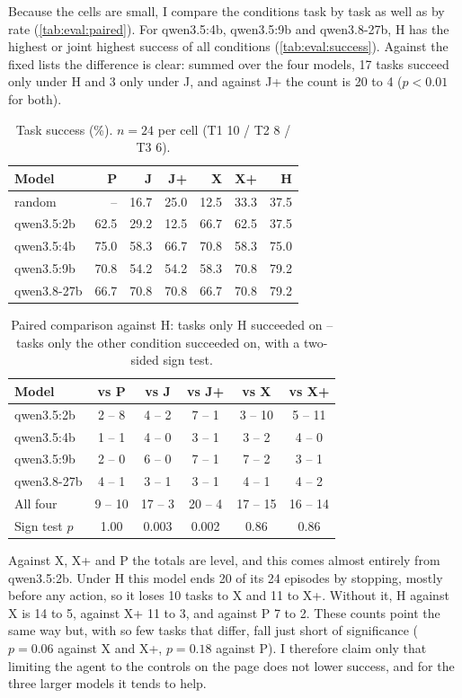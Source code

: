 Because the cells are small, I compare the conditions task by task as well as by rate (\autoref{tab:eval:paired}).
For qwen3.5:4b, qwen3.5:9b and qwen3.8-27b, H has the highest or joint highest success of all conditions (\autoref{tab:eval:success}).
Against the fixed lists the difference is clear: summed over the four models, 17 tasks succeed only under H and 3 only under J, and against J+ the count is 20 to 4 ($p < 0.01$ for both).

\begin{table}[htbp]
\centering
\caption{Task success (\%). $n = 24$ per cell (T1 10 / T2 8 / T3 6).}
\label{tab:eval:success}
\begin{tabular}{lrrrrrr}
\hline
Model & P & J & J+ & X & X+ & H \\
\hline
random & -- & 16.7 & 25.0 & 12.5 & 33.3 & 37.5 \\
qwen3.5:2b & 62.5 & 29.2 & 12.5 & 66.7 & 62.5 & 37.5 \\
qwen3.5:4b & 75.0 & 58.3 & 66.7 & 70.8 & 58.3 & 75.0 \\
qwen3.5:9b & 70.8 & 54.2 & 54.2 & 58.3 & 70.8 & 79.2 \\
qwen3.8-27b & 66.7 & 70.8 & 70.8 & 66.7 & 70.8 & 79.2 \\
\hline
\end{tabular}
\end{table}

\begin{table}[htbp]
\centering
\caption{Paired comparison against H: tasks only H succeeded on -- tasks only the other condition succeeded on, with a two-sided sign test.}
\label{tab:eval:paired}
\begin{tabular}{lccccc}
\hline
Model & vs P & vs J & vs J+ & vs X & vs X+ \\
\hline
qwen3.5:2b & 2 -- 8 & 4 -- 2 & 7 -- 1 & 3 -- 10 & 5 -- 11 \\
qwen3.5:4b & 1 -- 1 & 4 -- 0 & 3 -- 1 & 3 -- 2 & 4 -- 0 \\
qwen3.5:9b & 2 -- 0 & 6 -- 0 & 7 -- 1 & 7 -- 2 & 3 -- 1 \\
qwen3.8-27b & 4 -- 1 & 3 -- 1 & 3 -- 1 & 4 -- 1 & 4 -- 2 \\
\hline
All four & 9 -- 10 & 17 -- 3 & 20 -- 4 & 17 -- 15 & 16 -- 14 \\
Sign test $p$ & 1.00 & 0.003 & 0.002 & 0.86 & 0.86 \\
\hline
\end{tabular}
\end{table}

Against X, X+ and P the totals are level, and this comes almost entirely from qwen3.5:2b. Under H this model ends 20 of its 24 episodes by stopping, mostly before any action, so it loses 10 tasks to X and 11 to X+.
Without it, H against X is 14 to 5, against X+ 11 to 3, and against P 7 to 2.
These counts point the same way but, with so few tasks that differ, fall just short of significance ($p = 0.06$ against X and X+, $p = 0.18$ against P).
I therefore claim only that limiting the agent to the controls on the page does not lower success, and for the three larger models it tends to help.

